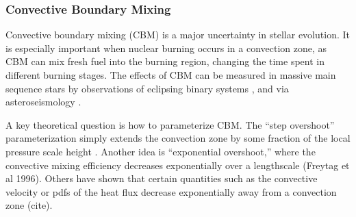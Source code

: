 {\color{purple}
\subsubsection{Convective Boundary Mixing}
}

Convective boundary mixing (CBM) is a major uncertainty in stellar evolution. It is especially important when nuclear burning occurs in a convection zone, as CBM can mix fresh fuel into the burning region, changing the time spent in different burning stages. The effects of CBM can be measured in massive main sequence stars by observations of eclipsing binary systems \cite[e.g.,][]{Stancliffe_2015,Valle_2016}, and via asteroseismology \citep[e.g.,][]{Ghasemi_2016}.

A key theoretical question is how to parameterize CBM. The ``step overshoot'' parameterization simply extends the convection zone by some fraction of the local pressure scale height \cite[e.g.,][]{Shaviv_1973}. Another idea is ``exponential overshoot,'' where the convective mixing efficiency decreases exponentially over a lengthscale \cite{Freytag1996}(Freytag et al 1996). Others have shown that certain quantities such as the convective velocity or pdfs of the heat flux decrease exponentially away from a convection zone (cite).